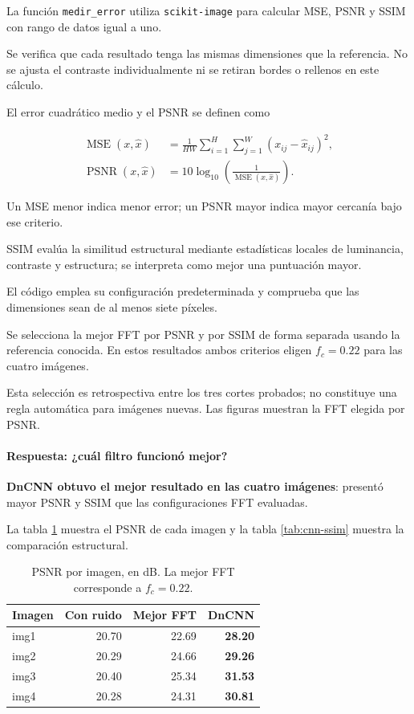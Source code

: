 \documentclass[11pt]{article}
\begin{document}
La función \texttt{medir\_error} utiliza
\texttt{scikit-image} para calcular MSE, PSNR y SSIM
con rango de datos igual a uno.

Se verifica que cada resultado tenga las mismas dimensiones
que la referencia. No se ajusta el contraste individualmente
ni se retiran bordes o rellenos en este cálculo.

El error cuadrático medio y el PSNR se definen como

\begin{align}
 \operatorname{MSE}(x,\widehat{x})
 &=
 \frac{1}{HW}
 \sum_{i=1}^{H}
 \sum_{j=1}^{W}
 (x_{ij}-\widehat{x}_{ij})^2,
 \\
 \operatorname{PSNR}(x,\widehat{x})
 &=
 10\log_{10}\!
 \left(
    \frac{1}{\operatorname{MSE}(x,\widehat{x})}
 \right).
\end{align}

Un MSE menor indica menor error; un PSNR mayor indica mayor
cercanía bajo ese criterio.

SSIM evalúa la similitud estructural mediante estadísticas
locales de luminancia, contraste y estructura; se interpreta
como mejor una puntuación mayor.

El código emplea su configuración predeterminada y comprueba
que las dimensiones sean de al menos siete píxeles.

Se selecciona la mejor FFT por PSNR y por SSIM de forma
separada usando la referencia conocida. En estos resultados
ambos criterios eligen $f_c=0.22$ para las cuatro imágenes.

Esta selección es retrospectiva entre los tres cortes
probados; no constituye una regla automática para imágenes
nuevas. Las figuras muestran la FFT elegida por PSNR.

\paragraph{Respuesta: ¿cuál filtro funcionó mejor?}

\textbf{DnCNN obtuvo el mejor resultado en las cuatro
imágenes}: presentó mayor PSNR y SSIM que las configuraciones
FFT evaluadas.

La tabla \ref{tab:cnn-psnr} muestra el PSNR de cada imagen
y la tabla \ref{tab:cnn-ssim} muestra la comparación
estructural.

\begin{table}[H]
\centering

\caption{
    PSNR por imagen, en dB.
    La mejor FFT corresponde a $f_c=0.22$.
}
\label{tab:cnn-psnr}

\begin{tabular}{lrrr}
\hline
\rowcolor{pastelblue}
Imagen & Con ruido & Mejor FFT & DnCNN\\
\hline
img1 & 20.70 & 22.69 & \textbf{28.20}\\
img2 & 20.29 & 24.66 & \textbf{29.26}\\
img3 & 20.40 & 25.34 & \textbf{31.53}\\
img4 & 20.28 & 24.31 & \textbf{30.81}\\
\hline
\end{tabular}
\end{table}
\end{document}
